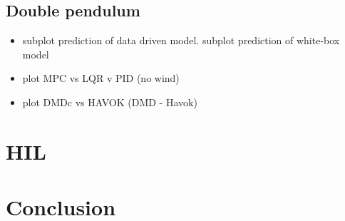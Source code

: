         \FloatBarrier\subsection{Double pendulum}

            \begin{itemize}
                \item subplot prediction of data driven model. subplot prediction of white-box model
                \item plot MPC vs LQR v PID (no wind)
                \item plot DMDc vs HAVOK (DMD - Havok)
            \end{itemize}

    \section{HIL}

    \section{Conclusion}


